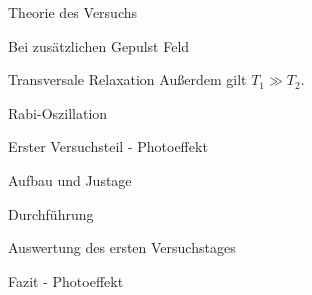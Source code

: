 \documentclass[pdftex, a4paper,11pt, twoside, ngerman]{report}
\begin{document}
\begin{chapter}{Theorie des Versuchs}
\begin{section}{Bei zusätzlichen Gepulst Feld}
\begin{subsection}{Transversale Relaxation}
            Außerdem gilt $T_1 \gg T_2$.
        \end{subsection}

        \begin{subsection}{Rabi-Oszillation}

        \end{subsection}
    \end{section}


    
  \end{chapter}
         
         
         
  \begin{chapter}{Erster Versuchsteil - Photoeffekt}
    \label{chp:Photoeffekt}
   
   
   
    \begin{section}{Aufbau und Justage}
      \label{chp:photoeffekt:sec:AufbauJustage}
      
      
      
    \end{section}
   
   
   
    \begin{section}{Durchführung}
      \label{chp:Aufbau:sec:ERSTERTEIL:subsec:UNTERTEIL}
      
      
      
    \end{section}
   
   
   
    \begin{section}{Auswertung des ersten Versuchstages}
      \label{chp:Photoeffekt:sec:Auswertung}
      
      
      
    \end{section}
   
   
   
    \begin{section}{Fazit - Photoeffekt}
      \label{chp:Photoeffekt:sec:Fazit}
      
      
      
    \end{section}
   
  \end{chapter}
 
\end{document}

